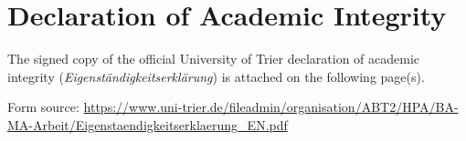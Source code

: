 \documentclass[11pt,a4paper]{article}
\begin{document}
\vspace{2em}

\section{Declaration of Academic Integrity}

\noindent
The signed copy of the official University of Trier declaration of academic integrity
(\emph{Eigenst\"andigkeitserkl\"arung}) is attached on the following page(s).

\vspace{0.6em}
\noindent
Form source: \url{https://www.uni-trier.de/fileadmin/organisation/ABT2/HPA/BA-MA-Arbeit/Eigenstaendigkeitserklaerung_EN.pdf}
\end{document}
